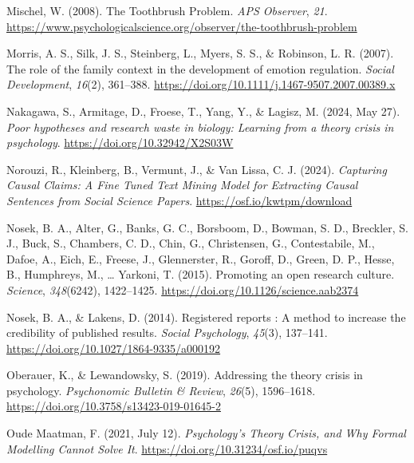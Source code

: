 \documentclass[man]{apa7}
\newlength{\cslhangindent}
\newenvironment{CSLReferences}[2] %
 {\begin{list}{}{%
  \setlength{\itemindent}{0pt}
  \setlength{\leftmargin}{0pt}
  \setlength{\parsep}{0pt}
  \ifodd #1
   \setlength{\leftmargin}{\cslhangindent}
   \setlength{\itemindent}{-1\cslhangindent}
  \fi
  \setlength{\itemsep}{#2\baselineskip}}}
 {\end{list}}
\begin{document}
\begin{CSLReferences}{1}{0}
Mischel, W. (2008). The {Toothbrush Problem}. \emph{APS Observer}, \emph{21}. \url{https://www.psychologicalscience.org/observer/the-toothbrush-problem}

Morris, A. S., Silk, J. S., Steinberg, L., Myers, S. S., \& Robinson, L. R. (2007). The role of the family context in the development of emotion regulation. \emph{Social Development}, \emph{16}(2), 361--388. \url{https://doi.org/10.1111/j.1467-9507.2007.00389.x}

Nakagawa, S., Armitage, D., Froese, T., Yang, Y., \& Lagisz, M. (2024, May 27). \emph{Poor hypotheses and research waste in biology: Learning from a theory crisis in psychology}. \url{https://doi.org/10.32942/X2S03W}

Norouzi, R., Kleinberg, B., Vermunt, J., \& Van Lissa, C. J. (2024). \emph{Capturing {Causal Claims}: {A Fine Tuned Text Mining Model} for {Extracting Causal Sentences} from {Social Science Papers}}. \url{https://osf.io/kwtpm/download}

Nosek, B. A., Alter, G., Banks, G. C., Borsboom, D., Bowman, S. D., Breckler, S. J., Buck, S., Chambers, C. D., Chin, G., Christensen, G., Contestabile, M., Dafoe, A., Eich, E., Freese, J., Glennerster, R., Goroff, D., Green, D. P., Hesse, B., Humphreys, M., \ldots{} Yarkoni, T. (2015). Promoting an open research culture. \emph{Science}, \emph{348}(6242), 1422--1425. \url{https://doi.org/10.1126/science.aab2374}

Nosek, B. A., \& Lakens, D. (2014). Registered reports : A method to increase the credibility of published results. \emph{Social Psychology}, \emph{45}(3), 137--141. \url{https://doi.org/10.1027/1864-9335/a000192}

Oberauer, K., \& Lewandowsky, S. (2019). Addressing the theory crisis in psychology. \emph{Psychonomic Bulletin \& Review}, \emph{26}(5), 1596--1618. \url{https://doi.org/10.3758/s13423-019-01645-2}

Oude Maatman, F. (2021, July 12). \emph{Psychology's {Theory Crisis}, and {Why Formal Modelling Cannot Solve It}}. \url{https://doi.org/10.31234/osf.io/puqvs}


\end{CSLReferences}
\end{document}
